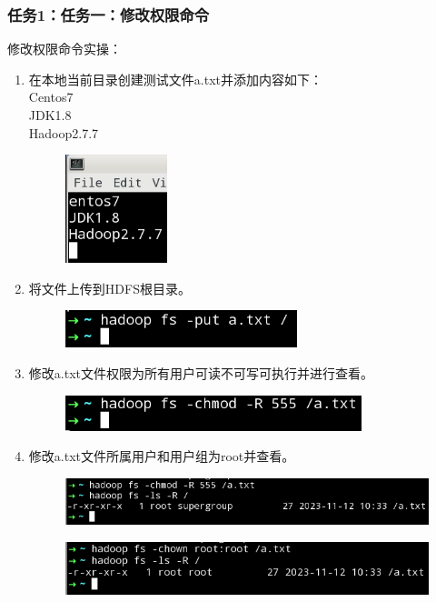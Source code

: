 \documentclass {article}
\begin{document}
	 		\subsubsection{任务1：任务一：修改权限命令}
	 			修改权限命令实操：
	 			\begin{enumerate}
	 				\item 在本地当前目录创建测试文件a.txt并添加内容如下：\\
	 				Centos7 \\
	 				JDK1.8 \\
	 				Hadoop2.7.7
	 				\begin{figure}[H]
	 					\centering
	 					\includegraphics{figures/fig18.png}
	 				\end{figure}
 				
 					\item 将文件上传到HDFS根目录。
 					\begin{figure}[H]
 						\centering
 						\includegraphics{figures/fig19.png}
 					\end{figure}
					
					\item 修改a.txt文件权限为所有用户可读不可写可执行并进行查看。
					\begin{figure}[H]
						\centering
						\includegraphics{figures/fig20.png}
					\end{figure}
				
					\item 修改a.txt文件所属用户和用户组为root并查看。
					\begin{figure}[H]
						\centering
						\includegraphics[width=4.5in]{figures/fig21.png}
					\end{figure}
					\begin{figure}[H]
						\centering
						\includegraphics[width=4.5in]{figures/fig22.png}
					\end{figure}
	 			\end{enumerate}
	 			
\end{document}
